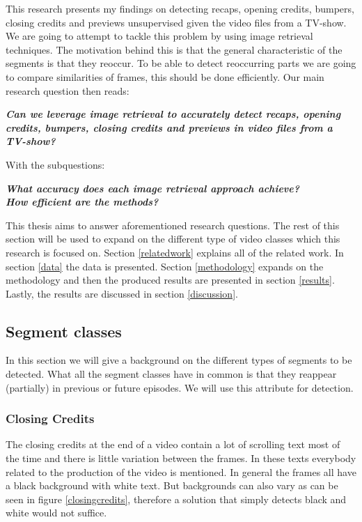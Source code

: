 \documentclass{article}
\begin{document}
This research presents my findings on detecting recaps, opening credits, bumpers, closing credits and previews unsupervised given the video files from a TV-show. We are going to attempt to tackle this problem by using image retrieval techniques. The motivation behind this is that the general characteristic of the segments is that they reoccur. To be able to detect reoccurring parts we are going to compare similarities of frames, this should be done efficiently. Our main research question then reads:
\newline
\begin{adjustwidth}{0.3in}{0.3in}
\textit{\textbf{Can we leverage image retrieval to accurately detect recaps, opening credits, bumpers, closing credits and previews in video files from a TV-show?\newline}}
\end{adjustwidth}
With the subquestions: \\
\begin{adjustwidth}{0.3in}{0.3in}
	\textit{\textbf{What accuracy does each image retrieval approach achieve?\newline}}\\
	\textit{\textbf{How efficient are the methods?\newline}}
\end{adjustwidth}
This thesis aims to answer aforementioned research questions. The rest of this section will be used to expand on the different type of video classes which this research is focused on. Section \ref{relatedwork} explains all of the related work. In section \ref{data} the data is presented. Section \ref{methodology} expands on the methodology and then the produced results are presented in section \ref{results}. Lastly, the results are discussed in section \ref{discussion}.

\subsection{Segment classes} \label{section:segmentclasses}
In this section we will give a background on the different types of segments to be detected. What all the segment classes have in common is that they reappear (partially) in previous or future episodes. We will use this attribute for detection. 

\subsubsection{Closing Credits}
The closing credits at the end of a video contain a lot of scrolling text most of the time and there is little variation between the frames. In these texts everybody related to the production of the video is mentioned. In general the frames all have a black background with white text. But backgrounds can also vary as can be seen in figure \ref{closingcredits}, therefore a solution that simply detects black and white would not suffice.
\end{document}
